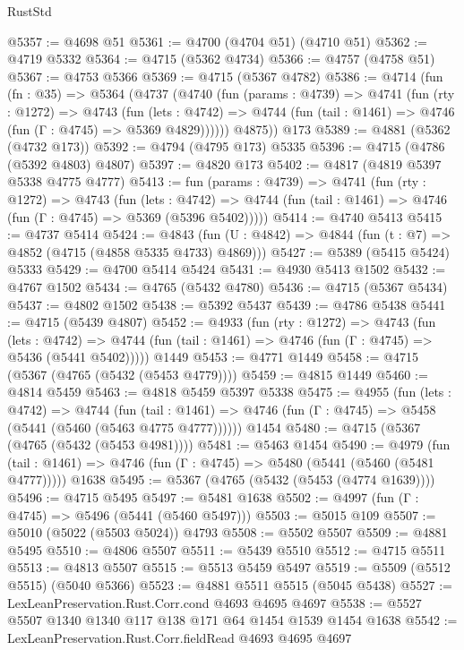 \begin{lexlean}{RustStd}
\begin{coremodule}
{\begin{coremodule}
{{{{{{{{{{{{{{{{{{{{{{{{{{{{{{@5357 := @4698 @51
@5361 := @4700 (@4704 @51) (@4710 @51)
@5362 := @4719 @5332
@5364 := @4715 (@5362 @4734)
@5366 := @4757 (@4758 @51)
@5367 := @4753 @5366
@5369 := @4715 (@5367 @4782)
@5386 := @4714
    (fun (fn : @35) =>
    @5364
      (@4737
        (@4740
          (fun (params : @4739) =>
          @4741
            (fun (rty : @1272) =>
            @4743
              (fun (lets : @4742) =>
              @4744 (fun (tail : @1461) => @4746 (fun (Γ : @4745) => @5369 @4829))))))
        @4875))
    @173
@5389 := @4881 (@5362 (@4732 @173))
@5392 := @4794 (@4795 @173) @5335
@5396 := @4715 (@4786 (@5392 @4803) @4807)
@5397 := @4820 @173
@5402 := @4817 (@4819 @5397 @5338 @4775 @4777)
@5413 := fun (params : @4739) =>
  @4741
    (fun (rty : @1272) =>
    @4743
      (fun (lets : @4742) =>
      @4744 (fun (tail : @1461) => @4746 (fun (Γ : @4745) => @5369 (@5396 @5402)))))
@5414 := @4740 @5413
@5415 := @4737 @5414
@5424 := @4843 (fun (U : @4842) => @4844 (fun (t : @7) => @4852 (@4715 (@4858 @5335 @4733) @4869)))
@5427 := @5389 (@5415 @5424) @5333
@5429 := @4700 @5414 @5424
@5431 := @4930 @5413 @1502
@5432 := @4767 @1502
@5434 := @4765 (@5432 @4780)
@5436 := @4715 (@5367 @5434)
@5437 := @4802 @1502
@5438 := @5392 @5437
@5439 := @4786 @5438
@5441 := @4715 (@5439 @4807)
@5452 := @4933
    (fun (rty : @1272) =>
    @4743
      (fun (lets : @4742) =>
      @4744 (fun (tail : @1461) => @4746 (fun (Γ : @4745) => @5436 (@5441 @5402)))))
    @1449
@5453 := @4771 @1449
@5458 := @4715 (@5367 (@4765 (@5432 (@5453 @4779))))
@5459 := @4815 @1449
@5460 := @4814 @5459
@5463 := @4818 @5459 @5397 @5338
@5475 := @4955
    (fun (lets : @4742) =>
    @4744
      (fun (tail : @1461) => @4746 (fun (Γ : @4745) => @5458 (@5441 (@5460 (@5463 @4775 @4777))))))
    @1454
@5480 := @4715 (@5367 (@4765 (@5432 (@5453 @4981))))
@5481 := @5463 @1454
@5490 := @4979
    (fun (tail : @1461) => @4746 (fun (Γ : @4745) => @5480 (@5441 (@5460 (@5481 @4777)))))
    @1638
@5495 := @5367 (@4765 (@5432 (@5453 (@4774 @1639))))
@5496 := @4715 @5495
@5497 := @5481 @1638
@5502 := @4997 (fun (Γ : @4745) => @5496 (@5441 (@5460 @5497)))
@5503 := @5015 @109
@5507 := @5010 (@5022 (@5503 @5024)) @4793
@5508 := @5502 @5507
@5509 := @4881 @5495
@5510 := @4806 @5507
@5511 := @5439 @5510
@5512 := @4715 @5511
@5513 := @4813 @5507
@5515 := @5513 @5459 @5497
@5519 := @5509 (@5512 @5515) (@5040 @5366)
@5523 := @4881 @5511 @5515 (@5045 @5438)
@5527 := LexLeanPreservation.Rust.Corr.cond @4693 @4695 @4697
@5538 := @5527 @5507 @1340 @1340 @117 @138 @171 @64 @1454 @1539 @1454 @1638
@5542 := LexLeanPreservation.Rust.Corr.fieldRead @4693 @4695 @4697
}}}}}}}}}}}}}}}}}}}}}}}}}}}}}}
\end{coremodule}}
\end{coremodule}
\end{lexlean}
